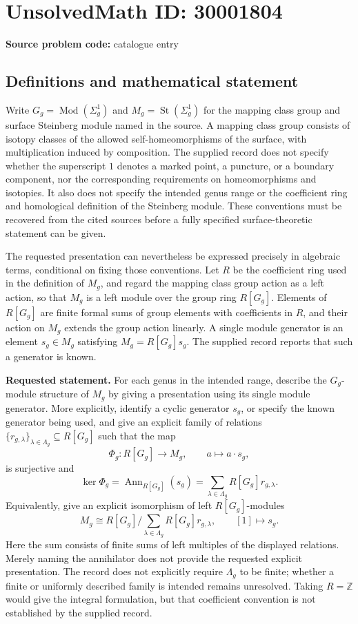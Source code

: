 \documentclass[11pt]{article}
\newcommand{\Z}{\mathbb{Z}}
\begin{document}
\section*{UnsolvedMath ID: 30001804}
\textbf{Source problem code:} catalogue entry
\subsection{Definitions and mathematical statement}
Write \(G_g=\operatorname{Mod}(\Sigma_g^1)\) and \(M_g=\operatorname{St}(\Sigma_g^1)\) for the mapping class group and surface Steinberg module named in the source. A mapping class group consists of isotopy classes of the allowed self-homeomorphisms of the surface, with multiplication induced by composition. The supplied record does not specify whether the superscript \(1\) denotes a marked point, a puncture, or a boundary component, nor the corresponding requirements on homeomorphisms and isotopies. It also does not specify the intended genus range or the coefficient ring and homological definition of the Steinberg module. These conventions must be recovered from the cited sources before a fully specified surface-theoretic statement can be given.

The requested presentation can nevertheless be expressed precisely in algebraic terms, conditional on fixing those conventions. Let \(R\) be the coefficient ring used in the definition of \(M_g\), and regard the mapping class group action as a left action, so that \(M_g\) is a left module over the group ring \(R[G_g]\). Elements of \(R[G_g]\) are finite formal sums of group elements with coefficients in \(R\), and their action on \(M_g\) extends the group action linearly. A single module generator is an element \(s_g\in M_g\) satisfying \(M_g=R[G_g]s_g\). The supplied record reports that such a generator is known.

\textbf{Requested statement.} For each genus in the intended range, describe the \(G_g\)-module structure of \(M_g\) by giving a presentation using its single module generator. More explicitly, identify a cyclic generator \(s_g\), or specify the known generator being used, and give an explicit family of relations \(\{r_{g,\lambda}\}_{\lambda\in\Lambda_g}\subseteq R[G_g]\) such that the map
\[
\Phi_g:R[G_g]\longrightarrow M_g,\qquad a\longmapsto a\cdot s_g,
\]
is surjective and
\[
\ker\Phi_g
=\operatorname{Ann}_{R[G_g]}(s_g)
=\sum_{\lambda\in\Lambda_g}R[G_g]r_{g,\lambda}.
\]
Equivalently, give an explicit isomorphism of left \(R[G_g]\)-modules
\[
M_g\cong R[G_g]\Big/\sum_{\lambda\in\Lambda_g}R[G_g]r_{g,\lambda},
\qquad [1]\longmapsto s_g.
\]
Here the sum consists of finite sums of left multiples of the displayed relations. Merely naming the annihilator does not provide the requested explicit presentation. The record does not explicitly require \(\Lambda_g\) to be finite; whether a finite or uniformly described family is intended remains unresolved. Taking \(R=\Z\) would give the integral formulation, but that coefficient convention is not established by the supplied record.
\end{document}
